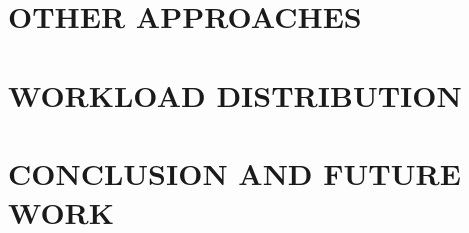 \documentclass[letterpaper, 10 pt, conference]{ieeeconf}  %
\begin{document}

\section{OTHER APPROACHES}



\section{WORKLOAD DISTRIBUTION}



\section{CONCLUSION AND FUTURE WORK}



\begin{thebibliography}{99}

\end{thebibliography}

\end{document}
